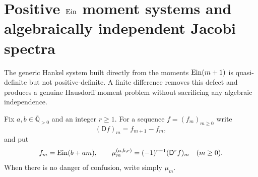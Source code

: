 \section{Positive \texorpdfstring{$\operatorname{Ein}$}{Ein} moment systems and
algebraically independent Jacobi spectra}
\label{sec:positive-ein-jacobi}

The generic Hankel system built directly from the moments
$\operatorname{Ein}(m+1)$ is quasi-definite but not positive-definite.  A finite
difference removes this defect and produces a genuine Hausdorff moment
problem without sacrificing any algebraic independence.

Fix $a,b\in\overline{\mathbb Q}_{>0}$ and an integer $r\geq1$.  For a
sequence $f=(f_m)_{m\geq0}$ write
\[
 (\mathsf Df)_m=f_{m+1}-f_m,
\]
and put
\begin{equation}\label{eq:positive-ein-moments}
 f_m=\operatorname{Ein}(b+am),\qquad
 \mu_m^{(a,b,r)}=(-1)^{r-1}(\mathsf D^rf)_m\quad(m\geq0).
\end{equation}
When there is no danger of confusion, write simply $\mu_m$.

